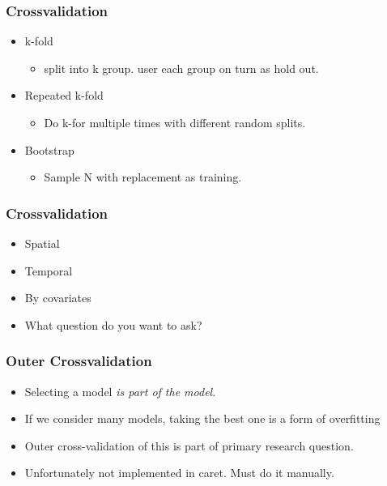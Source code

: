 \documentclass[handout, aspectratio = 169]{beamer}
\begin{document}
\begin{frame}
\frametitle{Crossvalidation}

\begin{itemize}
\item k-fold
\begin{itemize}
\item split into k group. user each group on turn as hold out.
\end{itemize}
\item Repeated k-fold
\begin{itemize}
\item Do k-for multiple times with different random splits.
\end{itemize}
\item Bootstrap
\begin{itemize}
\item Sample N with replacement as training.
\end{itemize}
\end{itemize}
\end{frame} 

\begin{frame}
\frametitle{Crossvalidation}

\begin{itemize}
\item Spatial
\item Temporal
\item By covariates
\item What question do you want to ask?
\end{itemize}
\end{frame} 


\begin{frame}
\frametitle{Outer Crossvalidation}

\begin{itemize}
\item Selecting a model \emph{is part of the model}.
\item If we consider many models, taking the best one is a form of overfitting
\item Outer cross-validation of this is part of primary research question.
\item Unfortunately not implemented in caret. Must do it manually.
\end{itemize}
\end{frame} 
\end{document}
